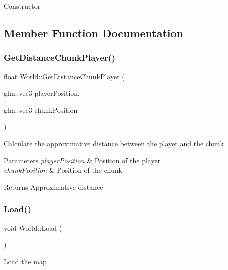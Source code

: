 Constructor 



\subsection{Member Function Documentation}
\mbox{\label{class_world_a1de2c2b22fa0ef78039e8935beb89b1b}} 
\subsubsection{\texorpdfstring{Get\+Distance\+Chunk\+Player()}{GetDistanceChunkPlayer()}}
{\footnotesize\ttfamily float World\+::\+Get\+Distance\+Chunk\+Player (\begin{DoxyParamCaption}\item[{glm\+::vec3}]{player\+Position,  }\item[{glm\+::vec3}]{chunk\+Position }\end{DoxyParamCaption})}



Calculate the approximative distance between the player and the chunk 


\begin{DoxyParams}{Parameters}
{\em player\+Position} & Position of the player\\
\hline
{\em chunk\+Position} & Position of the chunk\\
\hline
\end{DoxyParams}
\begin{DoxyReturn}{Returns}
Approximative distance
\end{DoxyReturn}
\mbox{\label{class_world_a0f570293be4fd6ab6b3d3cc986647971}} 
\subsubsection{\texorpdfstring{Load()}{Load()}}
{\footnotesize\ttfamily void World\+::\+Load (\begin{DoxyParamCaption}{ }\end{DoxyParamCaption})}



Load the map 

\mbox{\label{class_world_a89fd1fed1e6d40999644faf882bfb744}} 
